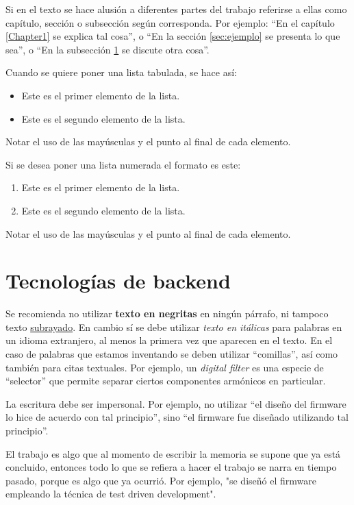 Si en el texto se hace alusión a diferentes partes del trabajo referirse a ellas como capítulo, sección o subsección según corresponda. Por ejemplo: ``En el capítulo \ref{Chapter1} se explica tal cosa'', o ``En la sección \ref{sec:ejemplo} se presenta lo que sea'', o ``En la subsección \ref{subsec:ejemplo} se discute otra cosa''.

Cuando se quiere poner una lista tabulada, se hace así:

\begin{itemize}
	\item Este es el primer elemento de la lista.
	\item Este es el segundo elemento de la lista.
\end{itemize}

Notar el uso de las mayúsculas y el punto al final de cada elemento.

Si se desea poner una lista numerada el formato es este:

\begin{enumerate}
	\item Este es el primer elemento de la lista.
	\item Este es el segundo elemento de la lista.
\end{enumerate}

Notar el uso de las mayúsculas y el punto al final de cada elemento.

\section{Tecnologías de backend}
\label{subsec:ejemplo}

Se recomienda no utilizar \textbf{texto en negritas} en ningún párrafo, ni tampoco texto \underline{subrayado}. En cambio sí se debe utilizar \textit{texto en itálicas} para palabras en un idioma extranjero, al menos la primera vez que aparecen en el texto. En el caso de palabras que estamos inventando se deben utilizar ``comillas'', así como también para citas textuales. Por ejemplo, un \textit{digital filter} es una especie de ``selector'' que permite separar ciertos componentes armónicos en particular.

La escritura debe ser impersonal. Por ejemplo, no utilizar ``el diseño del firmware lo hice de acuerdo con tal principio'', sino ``el firmware fue diseñado utilizando tal principio''. 

El trabajo es algo que al momento de escribir la memoria se supone que ya está concluido, entonces todo lo que se refiera a hacer el trabajo se narra en tiempo pasado, porque es algo que ya ocurrió. Por ejemplo, "se diseñó el firmware empleando la técnica de test driven development".

